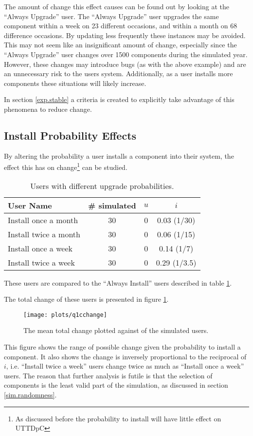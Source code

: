 The amount of change this effect causes can be found out by looking at the ``Always Upgrade'' user.
The ``Always Upgrade'' user upgrades the same component within a week on 23 different occasions, and within a month on 68 difference occasions.
By updating less frequently these instances may be avoided.
This may not seem like an insignificant amount of change, especially since the ``Always Upgrade'' user changes over 1500 components during the simulated year.
However, these changes may introduce bugs (as with the above example) and are an unnecessary risk to the users system.
Additionally, as a user installs more components these situations will likely increase.

In section \ref{exp.stable} a criteria is created to explicitly take advantage of this phenomena to reduce change.


\subsection{Install Probability Effects}
By altering the probability a user installs a component into their system, the effect this has on 
change\footnote{As discussed before the probability to install will have little effect on UTTDpC} can be studied. 
\begin{table}[h!]
\centering
\begin{tabular}{|l | c | c | c |}
\hline
User Name 				& \# simulated 	& $u$ 		& $i$ 			\\ \hline
Install once a month	& 30 			& 0 & 0.03 (1/30)							 \\
Install twice a month	& 30 			& 0 & 0.06 (1/15)						\\
Install once a week		& 30 			& 0 & 0.14 (1/7)					 \\
Install twice a week 	& 30 			& 0 & 0.29 (1/3.5)						\\ \hline
\end{tabular}
\caption{Users with different upgrade probabilities.}
\label{exp.tblextremeusers}
\end{table}
These users are compared to the ``Always Install'' users described in table \ref{exp.tblextremeusers}.

The total change of these users is presented in figure \ref{exp.q1cchange}.
\begin{figure}[htp]
\begin{center}
  \texttt{[image: plots/q1cchange]}
  \caption{The mean total change plotted against of the simulated users.}
  \label{exp.q1cchange}
\end{center}
\end{figure}
This figure shows the range of possible change given the probability to install a component.
It also shows the change is inversely proportional to the reciprocal of $i$, 
i.e. ``Install twice a week'' users change twice as much as ``Install once a week'' users.
The reason that further analysis is futile is that the selection of components is the least valid part of the simulation, as discussed in section \ref{sim.randomness}.
 

